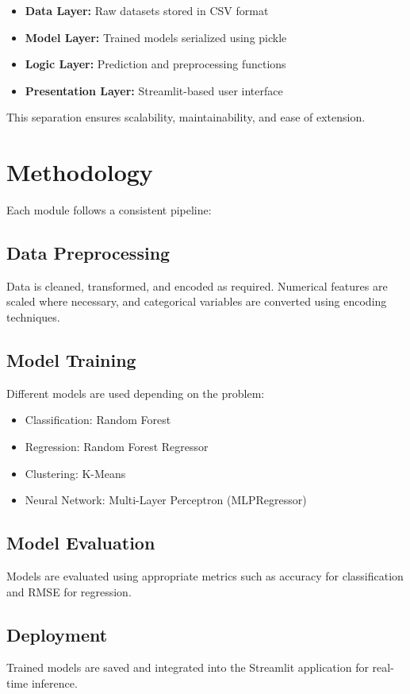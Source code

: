 \documentclass[conference]{IEEEtran}
\begin{document}
\begin{itemize}
    \item \textbf{Data Layer:} Raw datasets stored in CSV format
    \item \textbf{Model Layer:} Trained models serialized using pickle
    \item \textbf{Logic Layer:} Prediction and preprocessing functions
    \item \textbf{Presentation Layer:} Streamlit-based user interface
\end{itemize}

This separation ensures scalability, maintainability, and ease of extension.

\section{Methodology}

Each module follows a consistent pipeline:

\subsection{Data Preprocessing}
Data is cleaned, transformed, and encoded as required. Numerical features are scaled where necessary, and categorical variables are converted using encoding techniques.

\subsection{Model Training}
Different models are used depending on the problem:

\begin{itemize}
    \item Classification: Random Forest
    \item Regression: Random Forest Regressor
    \item Clustering: K-Means
    \item Neural Network: Multi-Layer Perceptron (MLPRegressor)
\end{itemize}

\subsection{Model Evaluation}
Models are evaluated using appropriate metrics such as accuracy for classification and RMSE for regression.

\subsection{Deployment}
Trained models are saved and integrated into the Streamlit application for real-time inference.
\end{document}
